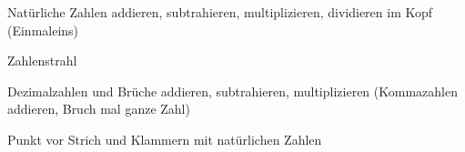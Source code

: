 \setcounter{aufgabe}{0}

\begin{aufgabe}{Natürliche Zahlen addieren, subtrahieren, multiplizieren, dividieren im Kopf (Einmaleins)}
\end{aufgabe}

\begin{aufgabe}{Zahlenstrahl}
\end{aufgabe}

\begin{aufgabe}{Dezimalzahlen und Brüche addieren, subtrahieren, multiplizieren (Kommazahlen addieren, Bruch mal ganze Zahl)}
\end{aufgabe}

\begin{aufgabe}{Punkt vor Strich und Klammern mit natürlichen Zahlen}
\end{aufgabe}

